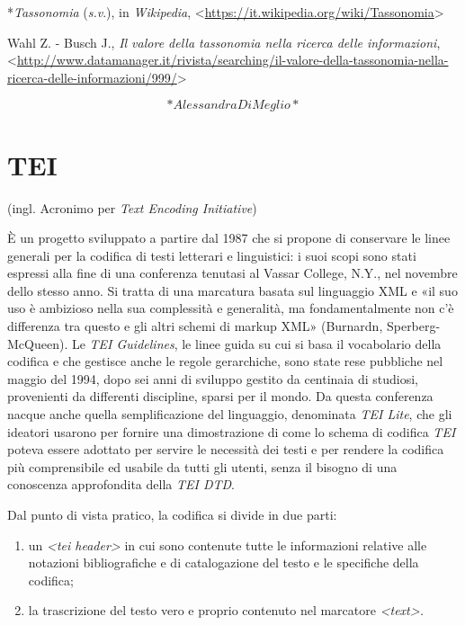 \documentclass[
  b5paper,
  twoside,
  11pt,
  chapterprefix=false,
  bibliography=totocnumbered,
  listof=flat]{scrbook}
\begin{document}
*\emph{Tassonomia} (\emph{s.v}.), in \emph{Wikipedia},
\textless{}{\url{https://it.wikipedia.org/wiki/Tassonomia}\textgreater{}}

Wahl Z. - Busch J., \emph{Il valore della tassonomia nella ricerca delle
informazioni},
\textless{}{\url{http://www.datamanager.it/rivista/searching/il-valore-della-tassonomia-nella-ricerca-delle-informazioni/999/}\textgreater{}}

\[*Alessandra Di Meglio*\]

\hypertarget{tei}{%
\chapter{TEI}\label{tei}}

(ingl. Acronimo per \emph{Text Encoding Initiative})

È un progetto sviluppato a partire dal 1987 che si propone di conservare
le linee generali per la codifica di testi letterari e linguistici: i
suoi scopi sono stati espressi alla fine di una conferenza tenutasi al
Vassar College, N.Y., nel novembre dello stesso anno. Si tratta di una
marcatura basata sul linguaggio XML e «il suo uso è ambizioso nella sua
complessità e generalità, ma fondamentalmente non c'è differenza tra
questo e gli altri schemi di markup XML» (Burnardn, Sperberg-McQueen).
Le \emph{TEI Guidelines}, le linee guida su cui si basa il vocabolario della
codifica e che gestisce anche le regole gerarchiche, sono state rese
pubbliche nel maggio del 1994, dopo sei anni di sviluppo gestito da
centinaia di studiosi, provenienti da differenti discipline, sparsi per
il mondo. Da questa conferenza nacque anche quella semplificazione del
linguaggio, denominata \emph{TEI Lite}, che gli ideatori usarono per fornire
una dimostrazione di come lo schema di codifica \emph{TEI} poteva essere
adottato per servire le necessità dei testi e per rendere la codifica
più comprensibile ed usabile da tutti gli utenti, senza il bisogno di
una conoscenza approfondita della \emph{TEI DTD}.

Dal punto di vista pratico, la codifica si divide in due parti:

\begin{enumerate}
\def\labelenumi{\arabic{enumi}.}
\item
  un \emph{\textless tei header\textgreater{}} in cui sono contenute tutte le informazioni
  relative alle notazioni bibliografiche e di catalogazione del testo
  e le specifiche della codifica;
\item
  la trascrizione del testo vero e proprio contenuto nel marcatore
  \emph{\textless text\textgreater.}
\end{enumerate}
\end{document}
